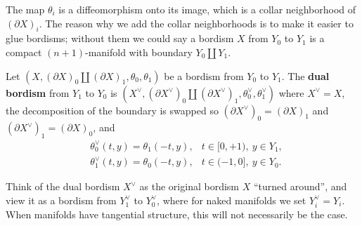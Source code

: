The map $\theta_i $ is a diffeomorphism onto its image, which is a collar neighborhood of $(\partial X)_i $. The reason why we add the collar neighborhoods is to make it easier to glue bordisms; without them we could say a bordism $X$ from $Y_0$ to $Y_1$ is a compact $(n+1)$-manifold with boundary $Y_0 \amalg Y_1$. 
\begin{definition}[]
    Let $(X,(\partial X)_0 \amalg (\partial X)_1, \theta_0, \theta_1)$ be a bordism from $Y_0$ to $Y_1$. The \textbf{dual bordism} from $Y_1$ to $Y_0$ is $(X^{\vee},(\partial X^{\vee})_0 \amalg (\partial X^{\vee})_1, \theta_0^{\vee},\theta_1^{\vee})$ where $X^{\vee}=X$, the decomposition of the boundary is swapped so  $(\partial X^{\vee})_0=(\partial X)_1$ and $(\partial X^{\vee})_1=(\partial X)_0$, and 
    \begin{align*}
        &\theta_0^{\vee}(t,y)=\theta_1(-t,y), &t \in [0,+1), \ y \in Y_1,\\
        &\theta_1^{\vee}(t,y)=\theta_0(-t,y),& t \in (-1,0], \ y \in Y_0.
    \end{align*}
\end{definition}
Think of the dual bordism $X^{\vee}$ as the original bordism $X$ ``turned around'', and view it as a bordism from $Y_1^{\vee}$ to $Y_0 ^{\vee}$, where for naked manifolds we set $Y_i ^{ \vee}=Y_i $. When manifolds have tangential structure, this will not necessarily be the case.

